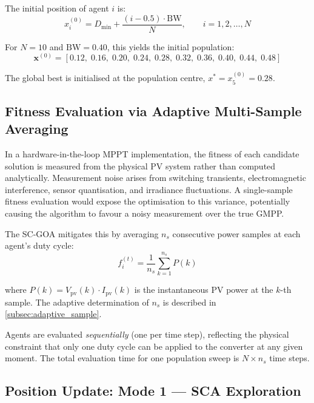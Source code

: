 \documentclass[a4paper, 12pt]{article}
\begin{document}
The initial position of agent $i$ is:
\begin{equation}
    x_i^{(0)} = D_{\min} + \frac{(i - 0.5) \cdot \mathrm{BW}}{N}, \qquad i = 1, 2, \ldots, N
    \label{eq:stratified_init}
\end{equation}

For $N = 10$ and $\mathrm{BW} = 0.40$, this yields the initial population:
\begin{equation}
    \mathbf{x}^{(0)} = [0.12,\; 0.16,\; 0.20,\; 0.24,\; 0.28,\; 0.32,\; 0.36,\; 0.40,\; 0.44,\; 0.48]
    \label{eq:init_population}
\end{equation}

The global best is initialised at the population centre, $x^{*} = x_5^{(0)} = 0.28$.


\subsection{Fitness Evaluation via Adaptive Multi-Sample Averaging}
\label{subsec:fitness_eval}

In a hardware-in-the-loop MPPT implementation, the fitness of each candidate solution is measured from the physical PV system rather than computed analytically. Measurement noise arises from switching transients, electromagnetic interference, sensor quantisation, and irradiance fluctuations. A single-sample fitness evaluation would expose the optimisation to this variance, potentially causing the algorithm to favour a noisy measurement over the true GMPP.

The SC-GOA mitigates this by averaging $n_s$ consecutive power samples at each agent's duty cycle:
\begin{equation}
    f_i^{(t)} = \frac{1}{n_s} \sum_{k=1}^{n_s} P(k)
    \label{eq:fitness_avg}
\end{equation}

where $P(k) = V_{\mathrm{pv}}(k) \cdot I_{\mathrm{pv}}(k)$ is the instantaneous PV power at the $k$-th sample. The adaptive determination of $n_s$ is described in \cref{subsec:adaptive_sample}.

Agents are evaluated \textit{sequentially} (one per time step), reflecting the physical constraint that only one duty cycle can be applied to the converter at any given moment. The total evaluation time for one population sweep is $N \times n_s$ time steps.


\subsection{Position Update: Mode 1 --- SCA Exploration}
\label{subsec:mode1}
\end{document}
